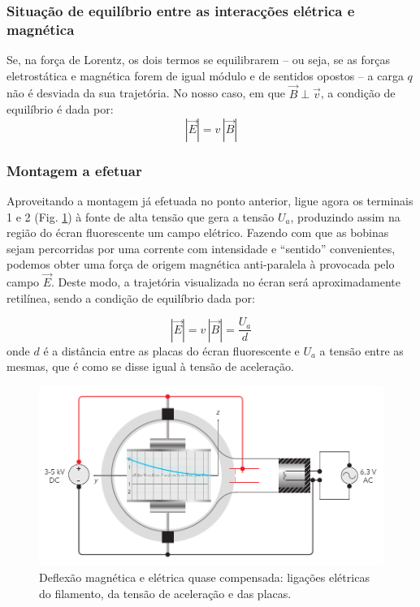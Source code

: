 \documentclass[12pt,a4paper,oneside]{paper}
\begin{document}
\subsubsection{\sf Situação de equilíbrio entre as interacções elétrica e magnética}

Se, na força de Lorentz, os dois termos se equilibrarem -- ou seja, se as forças eletrostática e magnética forem de igual
módulo e de sentidos opostos -- a carga $q$ não é desviada da sua trajetória. No nosso caso, em que $\vec{B} \perp \vec{v}$,
a condição de equilíbrio é dada por:
\begin{equation}
	\label{eq:equil1}
 |\vec{E}| = v\, |\vec{B}|
\end{equation}

\subsubsection{\sf Montagem a efetuar}

Aproveitando a montagem já efetuada no ponto anterior, ligue agora os terminais 1 e 2 (Fig. \ref{fig:TLE}) à fonte de alta
tensão que gera a tensão $U_a$, produzindo assim na região do écran fluorescente um campo elétrico. Fazendo com que as
bobinas sejam percorridas por uma corrente com intensidade e  ``sentido'' convenientes, podemos obter uma força de origem
magnética anti-paralela à provocada pelo campo $\vec{E}$. 
Deste modo, a trajetória visualizada no écran será aproximadamente retilínea, sendo a condição de equilíbrio dada por:

\begin{equation}
	\label{eq:equil2}
 |\vec{E}| = v\, |\vec{B}| = \frac{U_a}{d}
\end{equation}
onde $d$ é a distância entre as placas do écran fluorescente e $U_a$ a tensão entre as mesmas, que é como se disse igual
à tensão de aceleração.

\begin{figure}[H]
	[h]  \centering 
	\includegraphics[width=1\textwidth]{thomson_images/fig6-TuboTLE.pdf} 
	\caption{Deflexão magnética e elétrica quase compensada: ligações elétricas do filamento, da tensão de aceleração e
    das placas. \label{fig:TLE}} 
\end{figure}
\end{document}
